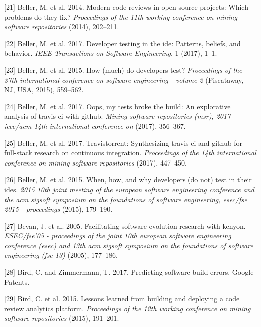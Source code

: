 \documentclass[]{book}
\begin{document}
\hypertarget{ref-beller2014modern}{}
{[}21{]} Beller, M. et al. 2014. Modern code reviews in open-source
projects: Which problems do they fix? \emph{Proceedings of the 11th
working conference on mining software repositories} (2014), 202--211.

\hypertarget{ref-beller2017developer}{}
{[}22{]} Beller, M. et al. 2017. Developer testing in the ide: Patterns,
beliefs, and behavior. \emph{IEEE Transactions on Software Engineering}.
1 (2017), 1--1.

\hypertarget{ref-Beller:2015:DT:2819009.2819101}{}
{[}23{]} Beller, M. et al. 2015. How (much) do developers test?
\emph{Proceedings of the 37th international conference on software
engineering - volume 2} (Piscataway, NJ, USA, 2015), 559--562.

\hypertarget{ref-beller2017oops}{}
{[}24{]} Beller, M. et al. 2017. Oops, my tests broke the build: An
explorative analysis of travis ci with github. \emph{Mining software
repositories (msr), 2017 ieee/acm 14th international conference on}
(2017), 356--367.

\hypertarget{ref-beller2017travistorrent}{}
{[}25{]} Beller, M. et al. 2017. Travistorrent: Synthesizing travis ci
and github for full-stack research on continuous integration.
\emph{Proceedings of the 14th international conference on mining
software repositories} (2017), 447--450.

\hypertarget{ref-beller2015}{}
{[}26{]} Beller, M. et al. 2015. When, how, and why developers (do not)
test in their ides. \emph{2015 10th joint meeting of the european
software engineering conference and the acm sigsoft symposium on the
foundations of software engineering, esec/fse 2015 - proceedings}
(2015), 179--190.

\hypertarget{ref-bevan2005}{}
{[}27{]} Bevan, J. et al. 2005. Facilitating software evolution research
with kenyon. \emph{ESEC/fse'05 - proceedings of the joint 10th european
software engineering conference (esec) and 13th acm sigsoft symposium on
the foundations of software engineering (fse-13)} (2005), 177--186.

\hypertarget{ref-bird2017predicting}{}
{[}28{]} Bird, C. and Zimmermann, T. 2017. Predicting software build
errors. Google Patents.

\hypertarget{ref-bird2015lessons}{}
{[}29{]} Bird, C. et al. 2015. Lessons learned from building and
deploying a code review analytics platform. \emph{Proceedings of the
12th working conference on mining software repositories} (2015),
191--201.
\end{document}
